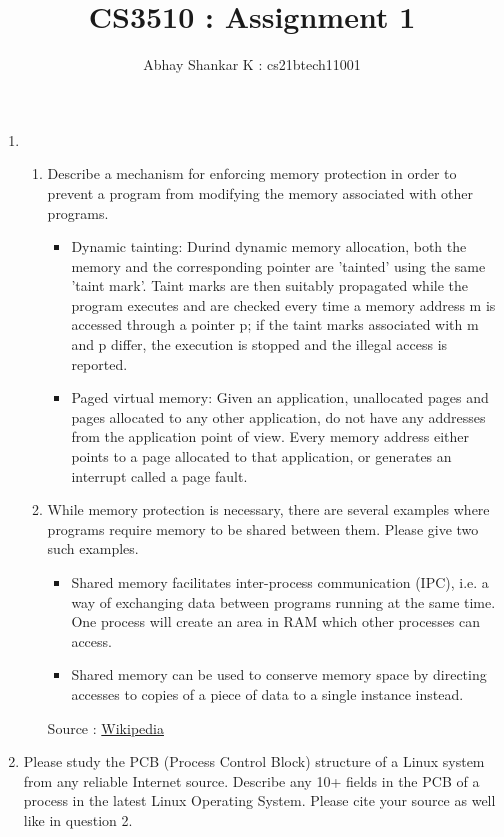 \documentclass[16pt]{amsart}           %
\newcommand{\me}{\author{Abhay Shankar K : cs21btech11001}
\maketitle}
\begin{document}
\title{CS3510 : Assignment 1}
\me
    \begin{enumerate}
        \item \begin{enumerate}
            \item Describe a mechanism for enforcing memory protection in order to prevent a program
            from modifying the memory associated with other programs.

            \begin{itemize}
                \item Dynamic tainting: Durind dynamic memory allocation, 
                both the memory and the corresponding pointer are 'tainted' using the same 
                'taint mark'. Taint marks are then suitably propagated while the program 
                executes and are checked every time a memory address m is accessed through 
                a pointer p; if the taint marks associated with m and p differ, the 
                execution is stopped and the illegal access is reported.
                \item Paged virtual memory: Given an application, unallocated pages and pages allocated to any other application, do not have
                any addresses from the application point of view. Every memory address either points to a page allocated to that 
                application, or generates an interrupt called a page fault. 


            \end{itemize}


\item While memory protection is necessary, there are several examples where programs
require memory to be shared between them. Please give two such examples.

\begin{itemize}
    \item Shared memory facilitates inter-process communication (IPC), i.e. a way of exchanging data between programs running at the same time.
    One process will create an area in RAM which other processes can access.
    \item Shared memory can be used to conserve memory space by directing accesses to copies of a piece of data to a
    single instance instead.
\end{itemize}
Source : \href{https://en.wikipedia.org/wiki/Shared_memory}{Wikipedia}
        \end{enumerate} 
        \item Please study the PCB (Process Control Block) structure of a Linux system from any reliable
        Internet source. Describe any 10+ fields in the PCB of a process in the latest Linux Operating
        System. Please cite your source as well like in question 2.


\end{enumerate}
\end{document}

